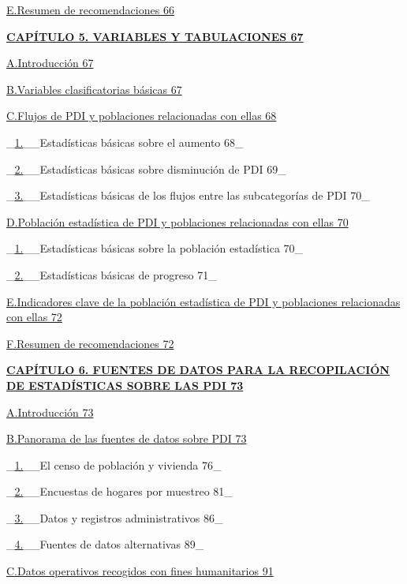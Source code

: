 \documentclass[
]{book}
\begin{document}
\protect\hyperlink{_Toc71834780}{E.Resumen de recomendaciones 66}

\textbf{\protect\hyperlink{_Toc71834781}{CAPÍTULO 5. VARIABLES Y TABULACIONES 67}}

\protect\hyperlink{_Toc71834782}{A.Introducción 67}

\protect\hyperlink{_Toc71834783}{B.Variables clasificatorias básicas 67}

\protect\hyperlink{_Toc71834784}{C.Flujos de PDI y poblaciones relacionadas con ellas 68}

\_\protect\hyperlink{_Toc71834785}{1.}\_\_Estadísticas básicas sobre el aumento 68\_

\_\protect\hyperlink{_Toc71834786}{2.}\_\_Estadísticas básicas sobre disminución de PDI 69\_

\_\protect\hyperlink{_Toc71834787}{3.}\_\_Estadísticas básicas de los flujos entre las subcategorías de PDI 70\_

\protect\hyperlink{_Toc71834788}{D.Población estadística de PDI y poblaciones relacionadas con ellas 70}

\_\protect\hyperlink{_Toc71834789}{1.}\_\_Estadísticas básicas sobre la población estadística 70\_

\_\protect\hyperlink{_Toc71834790}{2.}\_\_Estadísticas básicas de progreso 71\_

\protect\hyperlink{_Toc71834791}{E.Indicadores clave de la población estadística de PDI y poblaciones relacionadas con ellas 72}

\protect\hyperlink{_Toc71834792}{F.Resumen de recomendaciones 72}

\textbf{\protect\hyperlink{_Toc71834793}{CAPÍTULO 6. FUENTES DE DATOS PARA LA RECOPILACIÓN DE ESTADÍSTICAS SOBRE LAS PDI 73}}

\protect\hyperlink{_Toc71834794}{A.Introducción 73}

\protect\hyperlink{_Toc71834795}{B.Panorama de las fuentes de datos sobre PDI 73}

\_\protect\hyperlink{_Toc71834796}{1.}\_\_El censo de población y vivienda 76\_

\_\protect\hyperlink{_Toc71834797}{2.}\_\_Encuestas de hogares por muestreo 81\_

\_\protect\hyperlink{_Toc71834798}{3.}\_\_Datos y registros administrativos 86\_

\_\protect\hyperlink{_Toc71834799}{4.}\_\_Fuentes de datos alternativas 89\_

\protect\hyperlink{_Toc71834800}{C.Datos operativos recogidos con fines humanitarios 91}
\end{document}
